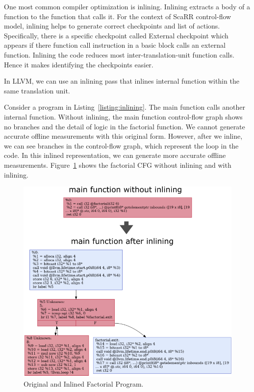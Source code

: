 One most common compiler optimization is inlining. Inlining extracts a body of a
function to the function that calls it. For the context of ScaRR control-flow
model, inlining helps to generate correct checkpoints and list of actions.
Specifically, there is a specific checkpoint called External checkpoint which
appears if there function call instruction in a basic block calls an external
function. Inlining the code reduces most inter-translation-unit function
calls. Hence it makes identifying the checkpoints easier.

In LLVM, we can use an inlining pass that inlines internal function within the same
translation unit.

Consider a program in Listing~\ref{listing:inlining}. The main function calls
another internal function. Without inlining, the main function control-flow
graph shows no branches and the detail of logic in the factorial function. We
cannot generate accurate offline measurements with this original form. However,
after we inline, we can see branches in the control-flow graph, which represent
the loop in the code. In this inlined representation, we can generate more
accurate offline measurements. Figure~\ref{fig:inlining} shows the factorial CFG
without inlining and with inlining.


\begin{figure}[h]
    \centerline{\includegraphics[scale=.70]{Figures/04/inlining-function.png}}
    \caption{Original and Inlined Factorial Program.}
    \label{fig:inlining}
\end{figure}

